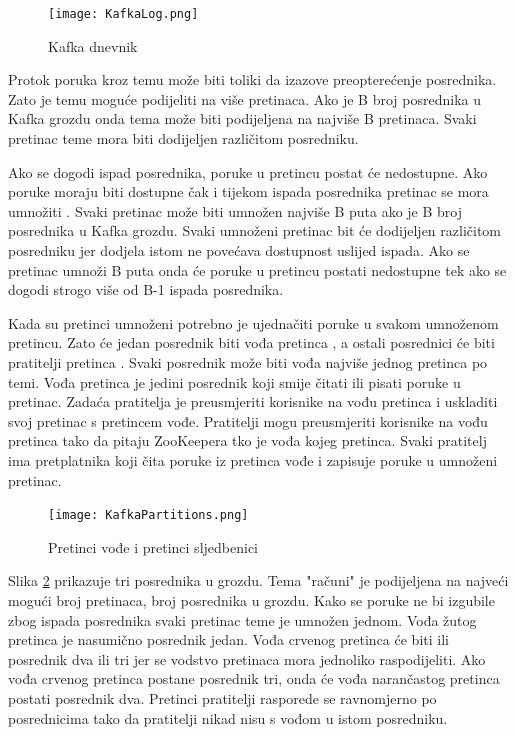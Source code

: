 \documentclass[utf8, diplomski, lmodern, numeric]{fer}
\begin{document}
\begin{figure}[H]
    \centering
    \texttt{[image: KafkaLog.png]}
    \caption{Kafka dnevnik}
    \label{fig:kafka-log}
\end{figure}

Protok poruka kroz temu može biti toliki da izazove preopterećenje posrednika. Zato je temu moguće podijeliti na više pretinaca. Ako je B broj posrednika u Kafka grozdu onda tema može biti podijeljena na najviše B pretinaca. Svaki pretinac teme mora biti dodijeljen različitom posredniku.

Ako se dogodi ispad posrednika, poruke u pretincu postat će nedostupne. Ako poruke moraju biti dostupne čak i tijekom ispada posrednika pretinac se mora umnožiti . Svaki pretinac može biti umnožen najviše B puta ako je B broj posrednika u Kafka grozdu. Svaki umnoženi pretinac  bit će dodijeljen različitom posredniku jer dodjela istom ne povećava dostupnost uslijed ispada. Ako se pretinac umnoži B puta onda će poruke u pretincu postati nedostupne tek ako se dogodi strogo više od B-1 ispada posrednika.

Kada su pretinci umnoženi potrebno je ujednačiti poruke u svakom umnoženom pretincu. Zato će jedan posrednik biti vođa pretinca , a ostali posrednici će biti pratitelji pretinca . Svaki posrednik može biti vođa najviše jednog pretinca po temi. Vođa pretinca je jedini posrednik koji smije čitati ili pisati poruke u pretinac. Zadaća pratitelja je preusmjeriti korisnike na vođu pretinca i uskladiti svoj pretinac s pretincem vođe. Pratitelji mogu preusmjeriti korisnike na vođu pretinca tako da pitaju ZooKeepera tko je vođa kojeg pretinca. Svaki pratitelj ima pretplatnika koji čita poruke iz pretinca vođe i zapisuje poruke u umnoženi pretinac.

\begin{figure}[H]
    \centering
    \texttt{[image: KafkaPartitions.png]}
    \caption{Pretinci vođe i pretinci sljedbenici}
    \label{fig:kafka-leader-follower}
\end{figure}

Slika \ref{fig:kafka-leader-follower} prikazuje tri posrednika u grozdu. Tema "računi" je podijeljena na najveći mogući broj pretinaca, broj posrednika u grozdu. Kako se poruke ne bi izgubile zbog ispada posrednika svaki pretinac teme je umnožen jednom. Vođa žutog pretinca je nasumično posrednik jedan. Vođa crvenog pretinca će biti ili posrednik dva ili tri jer se vodstvo pretinaca mora jednoliko raspodijeliti. Ako vođa crvenog pretinca postane posrednik tri, onda će vođa narančastog pretinca postati posrednik dva. Pretinci pratitelji rasporede se ravnomjerno po posrednicima tako da pratitelji nikad nisu s vođom u istom posredniku.
\end{document}
